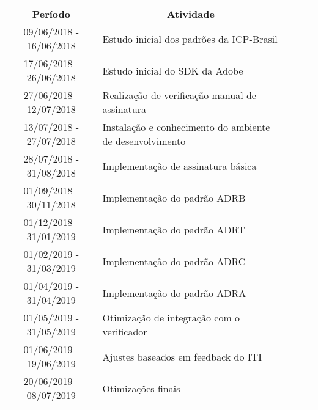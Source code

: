 \begin{table}[]
\begin{tabular}{|c|l|lll}
\cline{1-2}
\textbf{Período} & \multicolumn{1}{c|}{\textbf{Atividade}} &  &  &  \\ \cline{1-2}
09/06/2018 - 16/06/2018  & Estudo inicial dos padrões da ICP-Brasil &  &  &  \\ \cline{1-2}
17/06/2018 - 26/06/2018  & Estudo inicial do SDK da Adobe  &  &  &  \\ \cline{1-2}
27/06/2018 - 12/07/2018  & Realização de verificação manual de assinatura  &  &  &  \\ \cline{1-2}
13/07/2018 - 27/07/2018  & Instalação e conhecimento do ambiente de desenvolvimento &  &  &  \\ \cline{1-2}
28/07/2018 - 31/08/2018  & Implementação de assinatura básica &  &  &  \\ \cline{1-2}
01/09/2018 - 30/11/2018  & Implementação do padrão ADRB &  &  &  \\ \cline{1-2}
01/12/2018 - 31/01/2019  & Implementação do padrão ADRT &  &  &  \\ \cline{1-2}
01/02/2019 - 31/03/2019  & Implementação do padrão ADRC &  &  &  \\ \cline{1-2}
01/04/2019 - 31/04/2019  & Implementação do padrão ADRA &  &  &  \\ \cline{1-2}
01/05/2019 - 31/05/2019  & Otimização de integração com o verificador &  &  &  \\ \cline{1-2}
01/06/2019 - 19/06/2019  & Ajustes baseados em feedback do ITI &  &  &  \\ \cline{1-2}
20/06/2019 - 08/07/2019  & Otimizações finais &  &  &  \\ \cline{1-2}
\end{tabular}
\end{table}
